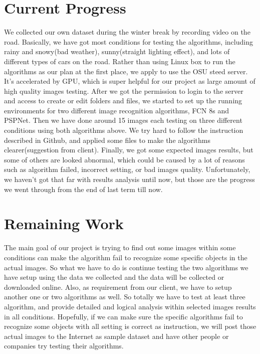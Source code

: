 \documentclass[10pt,draftclsnofoot,onecolumn,journal,compsoc]{IEEEtran}
\begin{document}
\section{Current Progress}
We collected our own dataset during the winter break by recording video on the road. Basically, we have got most conditions for testing the algorithms, including rainy and snowy(bad weather), sunny(straight lighting effect), and lots of different types of cars on the road. 
Rather than using Linux box to run the algorithms as our plan at the first place, we apply to use the OSU steed server. 
It's accelerated by GPU, which is super helpful for our project as large amount of high quality images testing. 
After we got the permission to login to the server and access to create or edit folders and files, we started to set up the running environments for two different image recognition algorithms, FCN 8s and PSPNet.
Then we have done around 15 images each testing on three different conditions using both algorithms above.
We try hard to follow the instruction described in Github, and applied some files to make the algorithms clearer(suggestion from client). 
Finally, we got some expected images results, but some of others are looked abnormal, which could be caused by a lot of reasons such as algorithm failed, incorrect setting, or bad images quality. Unfortunately, we haven't got that far with results analysis until now, but those are the progress we went through from the end of last term till now.  



\section{Remaining Work}
The main goal of our project is trying to find out some images within some conditions can make the algorithm fail to recognize some specific objects in the actual images. 
So what we have to do is continue testing the two algorithms we have setup using the data we collected and the data will be collected or downloaded online.
Also, as requirement from our client, we have to setup another one or two algorithms as well.
So totally we have to test at least three algorithm, and provide detailed and logical analysis within selected images results in all conditions.
Hopefully, if we can make sure the specific algorithms fail to recognize some objects with all setting is correct as instruction, we will post those actual images to the Internet as sample dataset and have other people or companies try testing their algorithms.
\end{document}

